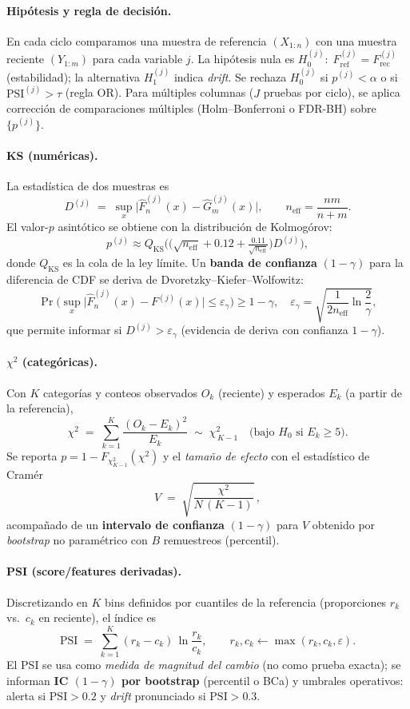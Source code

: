 \paragraph{Hipótesis y regla de decisión.}
En cada ciclo comparamos una muestra de referencia $(X_{1:n})$ con una muestra reciente $(Y_{1:m})$ para cada variable $j$.
La hipótesis nula es $H_0^{(j)}:\;F^{(j)}_{\mathrm{ref}} = F^{(j)}_{\mathrm{rec}}$ (estabilidad); la alternativa $H_1^{(j)}$ indica \textit{drift}.
Se rechaza $H_0^{(j)}$ si $p^{(j)}<\alpha$ o si $\mathrm{PSI}^{(j)}>\tau$ (regla OR). Para múltiples columnas ($J$ pruebas por ciclo), se aplica corrección de comparaciones múltiples (Holm–Bonferroni o FDR-BH) sobre $\{p^{(j)}\}$.

\paragraph{KS (numéricas).}
La estadística de dos muestras es
\[
D^{(j)} \;=\; \sup_x \big| \hat F^{(j)}_{\!n}(x) - \hat G^{(j)}_{\!m}(x) \big|, \qquad
n_{\mathrm{eff}}=\frac{nm}{n+m}.
\]
El valor-$p$ asintótico se obtiene con la distribución de Kolmogórov:
\[
p^{(j)} \approx Q_{\mathrm{KS}}\!\Big(\big(\sqrt{n_{\mathrm{eff}}}+0.12+\tfrac{0.11}{\sqrt{n_{\mathrm{eff}}}}\big) D^{(j)}\Big),
\]
donde $Q_{\mathrm{KS}}$ es la cola de la ley límite. Un \textbf{banda de confianza} $(1-\gamma)$ para la diferencia de CDF se deriva de Dvoretzky–Kiefer–Wolfowitz:
\[
\Pr\!\Big(\sup_x \big| \hat F^{(j)}_{\!n}(x) - F^{(j)}(x) \big| \le \varepsilon_\gamma\Big) \ge 1-\gamma,\quad
\varepsilon_\gamma=\sqrt{\frac{1}{2n_{\mathrm{eff}}}\ln\frac{2}{\gamma}},
\]
que permite informar si $D^{(j)} > \varepsilon_\gamma$ (evidencia de deriva con confianza $1-\gamma$).

\paragraph{$\chi^2$ (categóricas).}
Con $K$ categorías y conteos observados $O_k$ (reciente) y esperados $E_k$ (a partir de la referencia),
\[
\chi^2 \;=\; \sum_{k=1}^{K} \frac{(O_k-E_k)^2}{E_k}\;\sim\;\chi^2_{\,K-1}\quad\text{(bajo $H_0$ si $E_k\ge 5$).}
\]
Se reporta $p = 1-F_{\chi^2_{K-1}}(\chi^2)$ y el \emph{tamaño de efecto} con el estadístico de Cramér
\[
V \;=\; \sqrt{\frac{\chi^2}{N\,(K-1)}}\,,
\]
acompañado de un \textbf{intervalo de confianza} $(1-\gamma)$ para $V$ obtenido por \emph{bootstrap} no paramétrico con $B$ remuestreos (percentil).

\paragraph{PSI (score/features derivadas).}
Discretizando en $K$ bins definidos por cuantiles de la referencia (proporciones $r_k$ vs.\ $c_k$ en reciente), el índice es
\[
\mathrm{PSI} \;=\; \sum_{k=1}^{K} (r_k-c_k)\,\ln\!\frac{r_k}{c_k},\qquad
r_k,c_k \leftarrow \max(r_k,c_k,\varepsilon).
\]
El PSI se usa como \emph{medida de magnitud del cambio} (no como prueba exacta); se informan \textbf{IC $(1-\gamma)$ por bootstrap} (percentil o BCa) y umbrales operativos: alerta si $\mathrm{PSI}>0.2$ y \textit{drift} pronunciado si $\mathrm{PSI}>0.3$.

